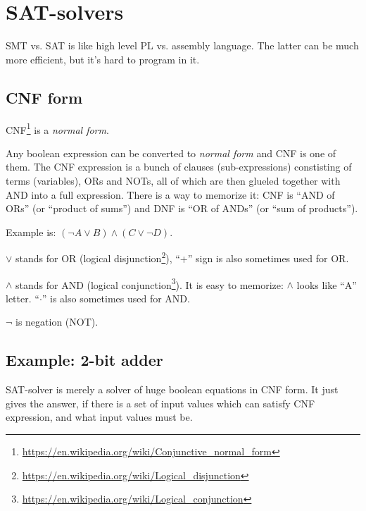 \section{\ac{SAT}-solvers}

SMT vs. SAT is like high level \ac{PL} vs. assembly language.
The latter can be much more efficient, but it's hard to program in it.

\subsection{CNF form}

\ac{CNF}\footnote{\url{https://en.wikipedia.org/wiki/Conjunctive_normal_form}} is a \textit{normal form}.


Any boolean expression can be converted to \textit{normal form} and \ac{CNF} is one of them.
The \ac{CNF} expression is a bunch of clauses (sub-expressions) constisting of terms (variables), ORs and NOTs, 
all of which are then glueled together with AND into a full expression.
There is a way to memorize it: \ac{CNF} is ``AND of ORs'' (or ``product of sums'') and \ac{DNF} is ``OR of ANDs'' (or ``sum of products'').

Example is: $(\neg A \vee B) \wedge (C \vee \neg D)$.

$\vee$ stands for OR (logical disjunction\footnote{\url{https://en.wikipedia.org/wiki/Logical_disjunction}}), 
``+'' sign is also sometimes used for OR.

$\wedge$ stands for AND (logical conjunction\footnote{\url{https://en.wikipedia.org/wiki/Logical_conjunction}}).
It is easy to memorize: $\wedge$ looks like ``A'' letter.
``$\cdot$'' is also sometimes used for AND.

$\neg$ is negation (NOT).


\subsection{Example: 2-bit adder}
\label{adder}

\ac{SAT}-solver is merely a solver of huge boolean equations in CNF form.
It just gives the answer, if there is a set of input values which can satisfy CNF expression, and what input values must be.

